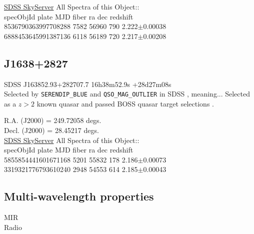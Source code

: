 \documentclass[a4paper,fleqn,usenatbib]{mnras}
\begin{document}
\href{skyserver.sdss.org/dr15/en/tools/explore/summary.aspx?id=1237678579819479655}{SDSS SkyServer}
All Spectra of this Object:: \\
specObjId	plate	MJD	fiber	ra	dec	redshift \\
8536790363997708288	7582	56960	790	2.222$\pm$0.00038\\
6888453645991387136	6118	56189	720	2.217$\pm$0.00208\\


\subsection{J1638+2827}
SDSS J163852.93+282707.7       16h38m52.9s +28d27m08s  \\
Selected by {\tt SERENDIP\_BLUE} and {\tt QSO\_MAG\_OUTLIER} in SDSS \citep{Richards2002}, meaning...
Selected as a $z>2$ known quasar and passed BOSS quasar target selections \citep{Ross2012}. 


R.A. (J2000) = 249.72058 degs. \\
Decl. (J2000) = 28.45217 degs. \\
\href{skyserver.sdss.org/dr15/en/tools/explore/Summary.aspx?id=1237662301375824232}{SDSS SkyServer} 
All Spectra of this Object:: \\
specObjId	plate	MJD	fiber	ra	dec	redshift \\
5855854441601671168	5201	55832	178	2.186$\pm$0.00073\\
3319321776793610240	2948	54553	614	2.185$\pm$0.00043\\



\subsection{Multi-wavelength properties}
MIR \\
Radio \\



\end{document}
